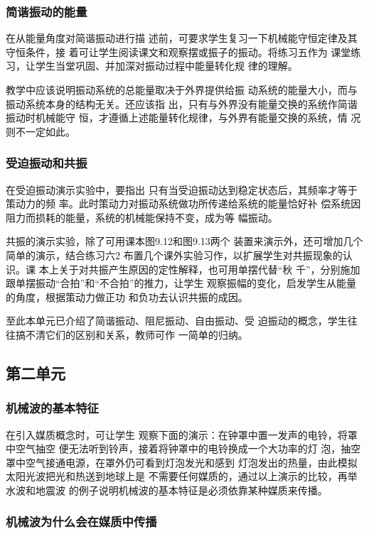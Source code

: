 \subsubsection{简谐振动的能量}

在从能量角度对简谐振动进行描
述前，可要求学生复习一下机械能守恒定律及其守恒条件，接
着可让学生阅读课文和观察摆或振子的振动。将练习五作为
课堂练习，让学生当堂巩固、并加深对振动过程中能量转化规
律的理解。

教学中应该说明振动系统的总能量取决于外界提供给振
动系统的能量大小，而与振动系统本身的结构无关。还应该指
出，只有与外界没有能量交换的系统作简谐振动时机械能守
恒，才遵循上述能量转化规律，与外界有能量交换的系统，情
况则不一定如此。

\subsubsection{受迫振动和共振}

在受迫振动演示实验中，要指出
只有当受迫振动达到稳定状态后，其频率才等于策动力的频
率。此时策动力对振动系统做功所传递给系统的能量恰好补
偿系统因阻力而损耗的能量，系统的机械能保持不变，成为等
幅振动。

共振的演示实验，除了可用课本图9.12和图9.13两个
装置来演示外，还可增加几个简单的演示，结合练习六2
布置几个课外实验习作，以扩展学生对共振现象的认识。课
本上关于对共振产生原因的定性解释，也可用单摆代替“秋
千”，分别施加跟单摆振动“合拍”和“不合拍”的推力，让学生
观察振幅的变化，启发学生从能量的角度，根据策动力做正功
和负功去认识共振的成因。

至此本单元已介绍了简谐振动、阻尼振动、自由振动、受
迫振动的概念，学生往往搞不清它们的区别和关系，教师可作
一简单的归纳。

\subsection{第二单元}
\subsubsection{机械波的基本特征}

在引入媒质概念时，可让学生
观察下面的演示：在钟罩中置一发声的电铃，将罩中空气抽空
便无法听到铃声，接着将钟罩中的电铃换成一个大功率的灯
泡，抽空罩中空气接通电源，在罩外仍可看到灯泡发光和感到
灯泡发出的热量，由此模拟太阳光波把光和热送到地球上是
不需要任何媒质的，通过以上演示的比较，再举水波和地震波
的例子说明机械波的基本特征是必须依靠某种媒质来传播。

\subsubsection{机械波为什么会在媒质中传播}

